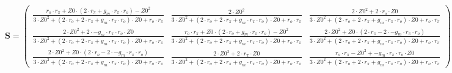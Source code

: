 \begin{equation}\mathbf{S}=\left(\begin{smallmatrix} \frac{r_o\cdot
r_{\pi}+Z0\cdot \left(2\cdot r_{\pi}+g_m\cdot r_{\pi}\cdot
r_o\right)-Z0^2}{3\cdot Z0^2+\left(2\cdot r_o+2\cdot r_{\pi}+g_m\cdot
r_{\pi}\cdot r_o\right)\cdot Z0+r_o\cdot r_{\pi}} & \frac{2\cdot
Z0^2}{3\cdot Z0^2+\left(2\cdot r_o+2\cdot r_{\pi}+g_m\cdot
r_{\pi}\cdot r_o\right)\cdot Z0+r_o\cdot r_{\pi}} & \frac{2\cdot
Z0^2+2\cdot r_o\cdot Z0}{3\cdot Z0^2+\left(2\cdot r_o+2\cdot
r_{\pi}+g_m\cdot r_{\pi}\cdot r_o\right)\cdot Z0+r_o\cdot r_{\pi}} \\
\frac{2\cdot Z0^2+2\cdot -g_m\cdot r_{\pi}\cdot r_o\cdot Z0}{3\cdot
Z0^2+\left(2\cdot r_o+2\cdot r_{\pi}+g_m\cdot r_{\pi}\cdot
r_o\right)\cdot Z0+r_o\cdot r_{\pi}} & \frac{r_o\cdot r_{\pi}+Z0\cdot
\left(2\cdot r_o+g_m\cdot r_{\pi}\cdot r_o\right)-Z0^2}{3\cdot
Z0^2+\left(2\cdot r_o+2\cdot r_{\pi}+g_m\cdot r_{\pi}\cdot
r_o\right)\cdot Z0+r_o\cdot r_{\pi}} & \frac{2\cdot Z0^2+Z0\cdot
\left(2\cdot r_{\pi}-2\cdot -g_m\cdot r_{\pi}\cdot r_o\right)}{3\cdot
Z0^2+\left(2\cdot r_o+2\cdot r_{\pi}+g_m\cdot r_{\pi}\cdot
r_o\right)\cdot Z0+r_o\cdot r_{\pi}} \\ \frac{2\cdot Z0^2+Z0\cdot
\left(2\cdot r_o-2\cdot -g_m\cdot r_{\pi}\cdot r_o\right)}{3\cdot
Z0^2+\left(2\cdot r_o+2\cdot r_{\pi}+g_m\cdot r_{\pi}\cdot
r_o\right)\cdot Z0+r_o\cdot r_{\pi}} & \frac{2\cdot Z0^2+2\cdot
r_{\pi}\cdot Z0}{3\cdot Z0^2+\left(2\cdot r_o+2\cdot r_{\pi}+g_m\cdot
r_{\pi}\cdot r_o\right)\cdot Z0+r_o\cdot r_{\pi}} & \frac{r_o\cdot
r_{\pi}-Z0^2+-g_m\cdot r_{\pi}\cdot r_o\cdot Z0}{3\cdot
Z0^2+\left(2\cdot r_o+2\cdot r_{\pi}+g_m\cdot r_{\pi}\cdot
r_o\right)\cdot Z0+r_o\cdot r_{\pi}}
\end{smallmatrix}\right)\end{equation}
